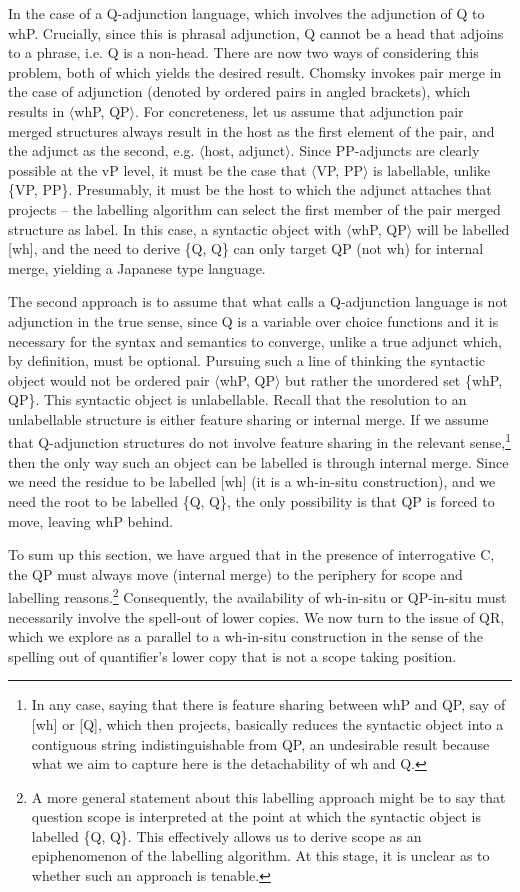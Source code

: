 \documentclass[charis]{glossa}
\begin{document}
In the case of a Q-adjunction language, which involves the adjunction of Q to whP. Crucially, since this is phrasal adjunction, Q cannot be a head that adjoins to a phrase, i.e. Q is a non-head. There are now two ways of considering this problem, both of which yields the desired result. Chomsky invokes pair merge in the case of adjunction (denoted by ordered pairs in angled brackets), which results in $\langle$whP, QP$\rangle$. For concreteness, let us assume that adjunction pair merged structures always result in the host as the first element of the pair, and the adjunct as the second, e.g. $\langle$host, adjunct$\rangle$. Since PP-adjuncts are clearly possible at the vP level, it must be the case that $\langle$VP, PP$\rangle$ is labellable, unlike \{VP, PP\}. Presumably, it must be the host to which the adjunct attaches that projects -- the labelling algorithm can select the first member of the pair merged structure as label. In this case, a syntactic object with $\langle$whP, QP$\rangle$ will be labelled [wh], and the need to derive \{Q, Q\} can only target QP (not wh) for internal merge, yielding a Japanese type language.

The second approach is to assume that what \cite{cable:2007} calls a Q-adjunction language is not adjunction in the true sense, since Q is a variable over choice functions and it is necessary for the syntax and semantics to converge, unlike a true adjunct which, by definition, must be optional. Pursuing such a line of thinking the syntactic object would not be ordered pair $\langle$whP, QP$\rangle$ but rather the unordered set \{whP, QP\}. This syntactic object is unlabellable. Recall that the resolution to an unlabellable structure is either feature sharing or internal merge. If we assume that Q-adjunction structures do not involve feature sharing in the relevant sense,\footnote{In any case, saying that there is feature sharing between whP and QP, say of [wh] or [Q], which then projects, basically reduces the syntactic object into a contiguous string indistinguishable from QP, an undesirable result because what we aim to capture here is the detachability of wh and Q.} then the only way such an object can be labelled is through internal merge. Since we need the residue to be labelled [wh] (it is a wh-in-situ construction), and we need the root to be labelled \{Q, Q\}, the only possibility is that QP is forced to move, leaving whP behind.

To sum up this section, we have argued that in the presence of interrogative C, the QP must always move (internal merge) to the periphery for scope and labelling reasons.\footnote{A more general statement about this labelling approach might be to say that question scope is interpreted at the point at which the syntactic object is labelled \{Q, Q\}. This effectively allows us to derive scope as an epiphenomenon of the labelling algorithm. At this stage, it is unclear as to whether such an approach is tenable.} Consequently, the availability of wh-in-situ or QP-in-situ must necessarily involve the spell-out of lower copies. We now turn to the issue of QR, which we explore as a parallel to a wh-in-situ construction in the sense of the spelling out of quantifier's lower copy that is not a scope taking position.
\end{document}
